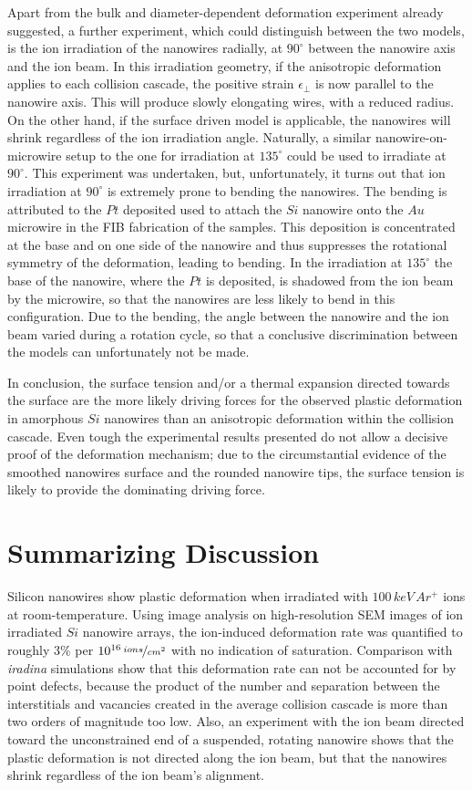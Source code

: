 Apart from the bulk and diameter-dependent deformation experiment already suggested, a further experiment, which could distinguish between the two models, is the ion irradiation of the nanowires radially, at $90^\circ$ between the nanowire axis and the ion beam. In this irradiation geometry, if the anisotropic deformation applies to each collision cascade, the positive strain $\epsilon_{\perp}$ is now parallel to the nanowire axis. This will produce slowly elongating wires, with a reduced radius. On the other hand, if the surface driven model is applicable, the nanowires will shrink regardless of the ion irradiation angle. Naturally, a similar nanowire-on-microwire setup to the one for irradiation at $135^\circ$ could be used to irradiate at $90^\circ$. This experiment was undertaken, but, unfortunately, it turns out that ion irradiation at $90^\circ$ is extremely prone to bending the nanowires. The bending is attributed to the $Pt$ deposited used to attach the $Si$ nanowire onto the $Au$ microwire in the FIB fabrication of the samples. This deposition is concentrated at the base and on one side of the nanowire and thus suppresses the rotational symmetry of the deformation, leading to bending. In the irradiation at $135^\circ$ the base of the nanowire, where the $Pt$ is deposited, is shadowed from the ion beam by the microwire, so that the nanowires are less likely to bend in this configuration. Due to the bending, the angle between the nanowire and the ion beam varied during a rotation cycle, so that a conclusive discrimination between the models can unfortunately not be made. 

In conclusion, the surface tension and/or a thermal expansion directed towards the surface are the more likely driving forces for the observed plastic deformation in amorphous $Si$ nanowires than an anisotropic deformation within the collision cascade. Even tough the experimental results presented do not allow a decisive proof of the deformation mechanism; due to the circumstantial evidence of the smoothed nanowires surface and the rounded nanowire tips, the surface tension is likely to provide the dominating driving force.


\section{Summarizing Discussion}

Silicon nanowires show plastic deformation when irradiated with $100\,keV\,Ar^+$ ions at room-temperature. Using image analysis on high-resolution SEM images of ion irradiated $Si$ nanowire arrays, the ion-induced deformation rate was quantified to roughly $3\%$ per $10^{16}\,\nicefrac{ions}{cm^2}$ with no indication of saturation. Comparison with \emph{iradina} simulations show that this deformation rate can not be accounted for by point defects, because the product of the number and separation between the interstitials and vacancies created in the average collision cascade is more than two orders of magnitude too low. Also, an experiment with the ion beam directed toward the unconstrained end of a suspended, rotating nanowire shows that the plastic deformation is not directed along the ion beam, but that the nanowires shrink regardless of the ion beam's alignment.

